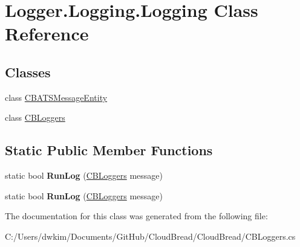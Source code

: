 \hypertarget{a00130}{}\section{Logger.\+Logging.\+Logging Class Reference}
\label{a00130}
\subsection*{Classes}
\begin{DoxyCompactItemize}
\item 
class \hyperlink{a00025}{C\+B\+A\+T\+S\+Message\+Entity}
\item 
class \hyperlink{a00043}{C\+B\+Loggers}
\end{DoxyCompactItemize}
\subsection*{Static Public Member Functions}
\begin{DoxyCompactItemize}
\item 
static bool {\bfseries Run\+Log} (\hyperlink{a00043}{C\+B\+Loggers} message)\hypertarget{a00130_ab9ee47be781439bd81b8546287e6c48c}{}\label{a00130_ab9ee47be781439bd81b8546287e6c48c}

\item 
static bool {\bfseries Run\+Log} (\hyperlink{a00043}{C\+B\+Loggers} message)\hypertarget{a00130_ab9ee47be781439bd81b8546287e6c48c}{}\label{a00130_ab9ee47be781439bd81b8546287e6c48c}

\end{DoxyCompactItemize}


The documentation for this class was generated from the following file\+:\begin{DoxyCompactItemize}
\item 
C\+:/\+Users/dwkim/\+Documents/\+Git\+Hub/\+Cloud\+Bread/\+Cloud\+Bread/C\+B\+Loggers.\+cs\end{DoxyCompactItemize}
